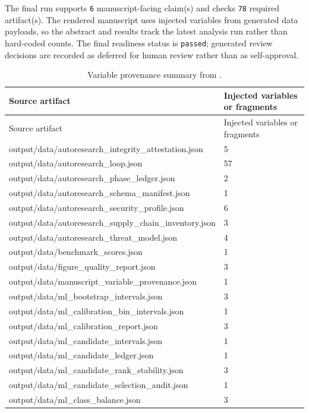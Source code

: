 \documentclass[
]{article}
\begin{document}
The final run supports \texttt{6} manuscript-facing claim(s) and checks
\texttt{78} required artifact(s). The rendered manuscript uses injected
variables from generated data payloads, so the abstract and results
track the latest analysis run rather than hard-coded counts. The final
readiness status is \texttt{passed}; generated review decisions are
recorded as deferred for human review rather than as self-approval.

\begin{longtable}[]{@{}ll@{}}
\caption{Variable provenance summary from
\protect{}.}\label{tbl:variable-provenance}\tabularnewline
\toprule\noalign{}
Source artifact & Injected variables or fragments \\
\midrule\noalign{}
\endfirsthead
\toprule\noalign{}
Source artifact & Injected variables or fragments \\
\midrule\noalign{}
\endhead
\bottomrule\noalign{}
\endlastfoot
output/data/autoresearch\_integrity\_attestation.json & 5 \\
output/data/autoresearch\_loop.json & 57 \\
output/data/autoresearch\_phase\_ledger.json & 2 \\
output/data/autoresearch\_schema\_manifest.json & 1 \\
output/data/autoresearch\_security\_profile.json & 6 \\
output/data/autoresearch\_supply\_chain\_inventory.json & 3 \\
output/data/autoresearch\_threat\_model.json & 4 \\
output/data/benchmark\_scores.json & 1 \\
output/data/figure\_quality\_report.json & 3 \\
output/data/manuscript\_variable\_provenance.json & 1 \\
output/data/ml\_bootstrap\_intervals.json & 3 \\
output/data/ml\_calibration\_bin\_intervals.json & 1 \\
output/data/ml\_calibration\_report.json & 3 \\
output/data/ml\_candidate\_intervals.json & 1 \\
output/data/ml\_candidate\_ledger.json & 1 \\
output/data/ml\_candidate\_rank\_stability.json & 3 \\
output/data/ml\_candidate\_selection\_audit.json & 1 \\
output/data/ml\_class\_balance.json & 3 \\

\end{longtable}
\end{document}
